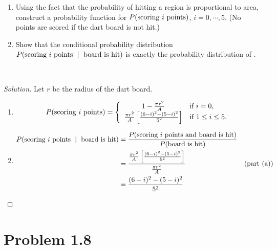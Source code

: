 \documentclass[12pt,letterpaper,reqno]{amsart}
\numberwithin{equation}{subsection}
\begin{document}
\begin{enumerate}[label=(\alph*), leftmargin=*]
    \item Using the fact that the probability of hitting a region is proportional to area, construct a probability function for ${P}\! \left( {\mbox{scoring $i$ points}} \right)$, $i = 0, \cdots, 5$. (No points are scored if the dart board is not hit.)
    
    \item Show that the conditional probability distribution $\fun{P}{\mbox{scoring $i$ points} \ \mid \ \mbox{board is hit}}$ is exactly the probability distribution of \cite[Example 1.2.7 on page 8]{Berger-Casella}.
\end{enumerate}~\\

\begin{proof}[Solution]

Let $r$ be the radius of the dart board.

\begin{enumerate}[label=(\alph*),leftmargin=*]
    \item \label{1.7a}
    
    \[ {P}\! \left( {\mbox{scoring $i$ points}} \right) = \left\{ \begin{array}{cl}
         1 - \frac{\pi r^2}{A} & \mbox{if $i = 0$},  \\
         \frac{\pi r^2}{A} \left[ \frac{(6-i)^2 - (5-i)^2}{5^2} \right] & \mbox{if $ 1 \leq i \leq 5$}.
    \end{array} \right. \]
    
    \item
    
    \begin{align*}
        {P}\! \left( {\mbox{scoring $i$ points} \ \mid \ \mbox{board is hit}} \right) &= \frac{{P}\! \left( {\mbox{scoring $i$ points and board is hit}} \right)}{{P}\! \left( {\mbox{board is hit}} \right)} \\
        &= \frac{\frac{\pi r^2}{A} \left[ \frac{(6-i)^2 - (5-i)^2}{5^2} \right]}{\frac{\pi r^2}{A}} & \left( \mbox{part (a)} \right) \\
        &= \frac{(6-i)^2 - (5-i)^2}{5^2}
    \end{align*}
\end{enumerate}
\end{proof}

\newpage
\section{Problem 1.8}
\end{document}
